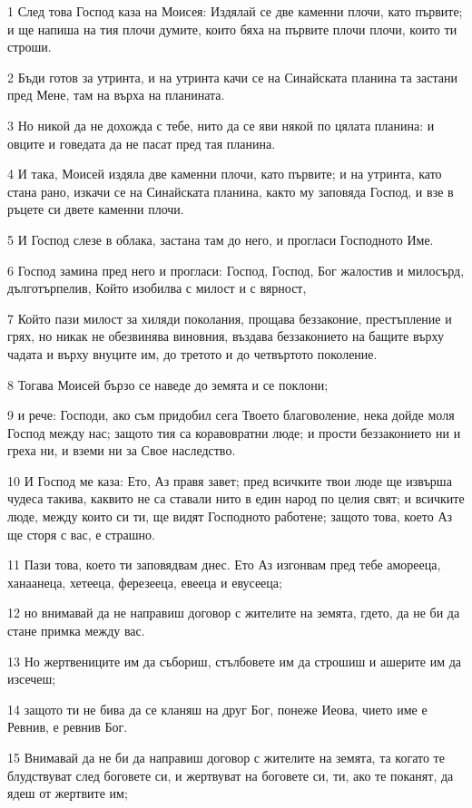 \par 1 След това Господ каза на Моисея: Издялай се две каменни плочи, като първите; и ще напиша на тия плочи думите, които бяха на първите плочи плочи, които ти строши.
\par 2 Бъди готов за утринта, и на утринта качи се на Синайската планина та застани пред Мене, там на върха на планината.
\par 3 Но никой да не дохожда с тебе, нито да се яви някой по цялата планина: и овците и говедата да не пасат пред тая планина.
\par 4 И така, Моисей издяла две каменни плочи, като първите; и на утринта, като стана рано, изкачи се на Синайската планина, както му заповяда Господ, и взе в ръцете си двете каменни плочи.
\par 5 И Господ слезе в облака, застана там до него, и прогласи Господното Име.
\par 6 Господ замина пред него и прогласи: Господ, Господ, Бог жалостив и милосърд, дълготърпелив, Който изобилва с милост и с вярност,
\par 7 Който пази милост за хиляди поколания, прощава беззаконие, престъпление и грях, но никак не обезвинява виновния, въздава беззаконието на бащите върху чадата и върху внуците им, до третото и до четвъртото поколение.
\par 8 Тогава Моисей бързо се наведе до земята и се поклони;
\par 9 и рече: Господи, ако съм придобил сега Твоето благоволение, нека дойде моля Господ между нас; защото тия са коравовратни люде; и прости беззаконието ни и греха ни, и вземи ни за Свое наследство.
\par 10 И Господ ме каза: Ето, Аз правя завет; пред всичките твои люде ще извърша чудеса такива, каквито не са ставали нито в един народ по целия свят; и всичките люде, между които си ти, ще видят Господното работене; защото това, което Аз ще сторя с вас, е страшно.
\par 11 Пази това, което ти заповядвам днес. Ето Аз изгонвам пред тебе аморееца, ханаанеца, хетееца, ферезееца, евееца и евусееца;
\par 12 но внимавай да не направиш договор с жителите на земята, гдето, да не би да стане примка между вас.
\par 13 Но жертвениците им да събориш, стълбовете им да строшиш и ашерите им да изсечеш;
\par 14 защото ти не бива да се кланяш на друг Бог, понеже Иеова, чието име е Ревнив, е ревнив Бог.
\par 15 Внимавай да не би да направиш договор с жителите на земята, та когато те блудствуват след боговете си, и жертвуват на боговете си, ти, ако те поканят, да ядеш от жертвите им;
